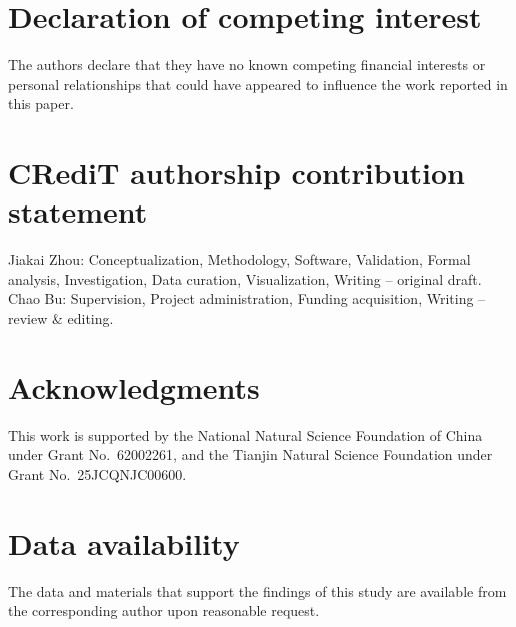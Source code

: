\documentclass[11pt, a4paper]{article}
\begin{document}
\section*{Declaration of competing interest}
The authors declare that they have no known competing financial interests or personal relationships that could have appeared to influence the work reported in this paper.

\section*{CRediT authorship contribution statement}
Jiakai Zhou: Conceptualization, Methodology, Software, Validation, Formal analysis, Investigation, Data curation, Visualization, Writing -- original draft. Chao Bu: Supervision, Project administration, Funding acquisition, Writing -- review \& editing.

\section*{Acknowledgments}
This work is supported by the National Natural Science Foundation of China under Grant No.~62002261, and the Tianjin Natural Science Foundation under Grant No.~25JCQNJC00600.

\section*{Data availability}
The data and materials that support the findings of this study are available from the corresponding author upon reasonable request.
\end{document}
